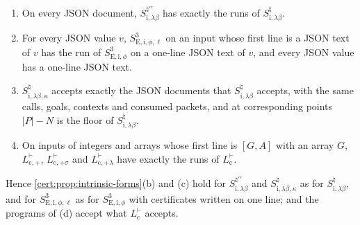 \begin{proposition}\label{cert:prop:same-runs}
\begin{enumerate}[label=(\alph*)]
\item On every JSON document, $S^{\natural\prime\prime}_{\mathrm{i},\lambda\beta}$ has exactly the
runs of $S^{\natural}_{\mathrm{i},\lambda\beta}$.
\item For every JSON value $v$, $S^{3}_{\mathrm{E,i},\phi,\ell}$ on an input whose first line is a
JSON text of $v$ has the run of $S^{3}_{\mathrm{E,i},\phi}$ on a one-line JSON text of $v$, and every
JSON value has a one-line JSON text.
\item $S^{\natural}_{\mathrm{i},\lambda\beta,\kappa}$ accepts exactly the JSON documents that
$S^{\natural}_{\mathrm{i},\lambda\beta}$ accepts, with the same calls, goals, contexts and consumed
packets, and at corresponding points $\lvert P\rvert-N$ is the floor of
$S^{\natural}_{\mathrm{i},\lambda\beta}$.
\item On inputs of integers and arrays whose first line is $[G,A]$ with an array $G$,
$L^{\vdash}_{\mathrm{c},+}$, $L^{\vdash}_{\mathrm{c},+\sigma}$ and $L^{\vdash}_{\mathrm{c},+\lambda}$
have exactly the runs of $L^{\vdash}_{\mathrm c}$.
\end{enumerate}
Hence \cref{cert:prop:intrinsic-forms}(b) and (c) hold for $S^{\natural\prime\prime}_{\mathrm{i},\lambda\beta}$
and $S^{\natural}_{\mathrm{i},\lambda\beta,\kappa}$ as for $S^{\natural}_{\mathrm{i},\lambda\beta}$, and
for $S^{3}_{\mathrm{E,i},\phi,\ell}$ as for $S^{3}_{\mathrm{E,i},\phi}$ with certificates written on
one line; and the programs of (d) accept what $L^{\vdash}_{\mathrm c}$ accepts.
\end{proposition}
